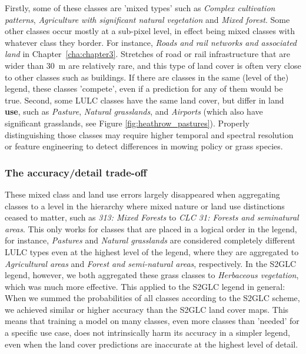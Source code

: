         Firstly, some of these classes are 'mixed types' such as \textit{Complex cultivation patterns}, \textit{Agriculture with significant natural vegetation} and \textit{Mixed forest}. Some other classes occur mostly at a sub-pixel level, in effect being mixed classes with whatever class they border. For instance, \textit{Roads and rail networks and associated land} in Chapter\@~\ref{cha:chapter3}. Stretches of road or rail infrastructure that are wider than 30~m are relatively rare, and this type of land cover is often very close to other classes such as buildings. If there are classes in the same (level of the) legend, these classes 'compete', even if a prediction for any of them would be true. 
        Second, some LULC classes have the same land cover, but differ in land \textbf{use}, such as \textit{Pasture}, \textit{Natural grasslands}, and \textit{Airports} (which also have significant grasslands, see Figure \ref{fig:heathrow_pastures}). Properly distinguishing those classes may require higher temporal and spectral resolution or feature engineering to detect differences in mowing policy or grass species. 

        \subsubsection{The accuracy/detail trade-off}
        
            These mixed class and land use errors largely disappeared when aggregating classes to a level in the hierarchy where mixed nature or land use distinctions ceased to matter, such as \textit{313: Mixed Forests} to \textit{CLC 31: Forests and seminatural areas}. This only works for classes that are placed in a logical order in the legend, for instance, \textit{Pastures} and \textit{Natural grasslands} are considered completely different LULC types even at the highest level of the legend, where they are aggregated to \textit{Agricultural areas} and \textit{Forest and semi-natural areas}, respectively. In the S2GLC legend, however, we both aggregated these grass classes to \textit{Herbaceous vegetation}, which was much more effective. This applied to the S2GLC legend in general: When we summed the probabilities of all classes according to the S2GLC scheme, we achieved similar or higher accuracy than the S2GLC land cover maps. This means that training a model on many classes, even more classes than 'needed' for a specific use case, does not intrinsically harm its accuracy in a simpler legend, even when the land cover predictions are inaccurate at the highest level of detail.

